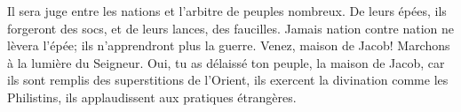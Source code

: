 Il sera juge entre les nations
	et l’arbitre de peuples nombreux.
De leurs épées, ils forgeront des socs,
	et de leurs lances, des faucilles.
Jamais nation contre nation ne lèvera l’épée;
	ils n’apprendront plus la guerre.
Venez, maison de Jacob! Marchons à la lumière du Seigneur.
Oui, tu as délaissé ton peuple, la maison de Jacob,
	car ils sont remplis des superstitions de l’Orient,
	ils exercent la divination comme les Philistins,
	ils applaudissent aux pratiques étrangères.
